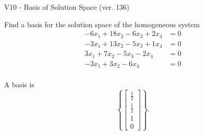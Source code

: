 \begin{exercise}
  \begin{exerciseTitle}V10 - Basis of Solution Space (ver. 136)\end{exerciseTitle}
  \begin{exerciseStatement}
    Find a basis for the solution space of the homogeneous system 
\begin{align*}
 -6 x_ 1 + 18 x_ 2 -6 x_ 3 + 2 x_ 4 &= 0  \\ 
  -3 x_ 1 + 13 x_ 2 -5 x_ 3 + 1 x_ 4 &= 0  \\ 
  3 x_ 1 + 7 x_ 2 -5 x_ 3 -2 x_ 4 &= 0  \\ 
  -3 x_ 1 + 3 x_ 2 -6 x_ 4 &= 0  \\ 
 \end{align*}


 
  \end{exerciseStatement}

  \begin{exerciseAnswer}
   A basis is   
\[\left\{\left[\begin{array}{c}
\frac{1}{2} \\
\frac{1}{2} \\
1 \\
0
\end{array}\right]\right\}.\]

  


  \end{exerciseAnswer}
\end{exercise}